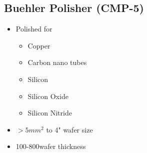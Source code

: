 \subsection{Buehler Polisher (CMP-5)}\label{cmp_machine_unclean}
\WaferNonStandard

\begin{minipage}[H]{\MachinePictureMiniPageWidth}
\end{minipage}\begin{minipage}[H]{\MachineTextMiniPageWidth}
\begin{itemize}
	\item Polished for
	\begin{itemize}
		\item Copper
		\item Carbon nano tubes
		\item Silicon
		\item Silicon Oxide 
		\item Silicon Nitride
	\end{itemize}
	\item $>5mm^2$ to 4" wafer size
	\item 100-800\um wafer thickness
\end{itemize}
\end{minipage}